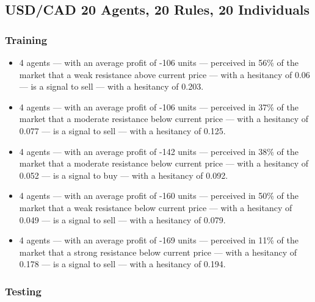 \subsection{USD/CAD 20 Agents, 20 Rules, 20 Individuals}
\label{}

\subsubsection{Training}
\label{}

{\small
  \begin{itemize}
  \item 4 agents — with an average profit of -106 units — perceived in 56\% of
    the market that a weak resistance above current price — with a hesitancy of
    0.06 — is a signal to sell — with a hesitancy of 0.203.
  \item 4 agents — with an average profit of -106 units — perceived in 37\% of
    the market that a moderate resistance below current price — with a hesitancy
    of 0.077 — is a signal to sell — with a hesitancy of 0.125.
  \item 4 agents — with an average profit of -142 units — perceived in 38\% of
    the market that a moderate resistance below current price — with a hesitancy
    of 0.052 — is a signal to buy — with a hesitancy of 0.092.
  \item 4 agents — with an average profit of -160 units — perceived in 50\% of
    the market that a weak resistance below current price — with a hesitancy of
    0.049 — is a signal to sell — with a hesitancy of 0.079.
  \item 4 agents — with an average profit of -169 units — perceived in 11\% of
    the market that a strong resistance below current price — with a hesitancy
    of 0.178 — is a signal to sell — with a hesitancy of 0.194.
  \end{itemize}
}

\subsubsection{Testing}
\label{}

